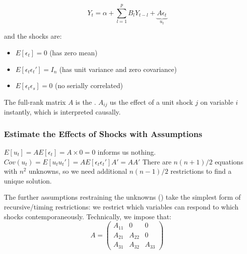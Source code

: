             \begin{equation*}
                Y_t = \alpha + \sum_{l=1}^p B_l Y_{t-l} + \underbrace{A\epsilon_t}_{u_t}
            \end{equation*}
            
            and the shocks are:
            
            \begin{itemize}
                \item $E[\epsilon_t]=0$ (has zero mean)
                \item $E[\epsilon_t \epsilon_t']=I_n$ (has unit variance and zero covariance)
                \item $E[\epsilon_t \epsilon_s]=0$ (no serially correlated)
            \end{itemize}
    
            The full-rank matrix $A$ is the . $A_{ij}$ us the effect of a unit shock $j$ on variable $i$ instantly, which is interpreted causally.

        \subsubsection{Estimate the Effects of Shocks with Assumptions}

            $E[u_t]=AE[\epsilon_t]=A\times 0=0$ informs us nothing.\\
            $Cov(u_t)=E[u_tu_t']=AE[\epsilon_t\epsilon_t']A'=AA'$ There are $n(n+1)/2$ equations with $n^2$ unknowns, so we need additional $n(n-1)/2$ restrictions to find a unique solution.

            The further assumptions restraining the unknowns () take the simplest form of recursive/timing restrictions: we restrict which variables can respond to which shocks contemporaneously. Technically, we impose that:
            \begin{equation}
                A=\begin{pmatrix}
                A_{11} & 0 & 0\\
                A_{21} & A_{22} & 0\\
                A_{31} & A_{32} & A_{33}
            \end{pmatrix}
            \label{eqn:SVAR_assumption_2}
            \tag{SVAR Assumption 2}
            \end{equation}
            
